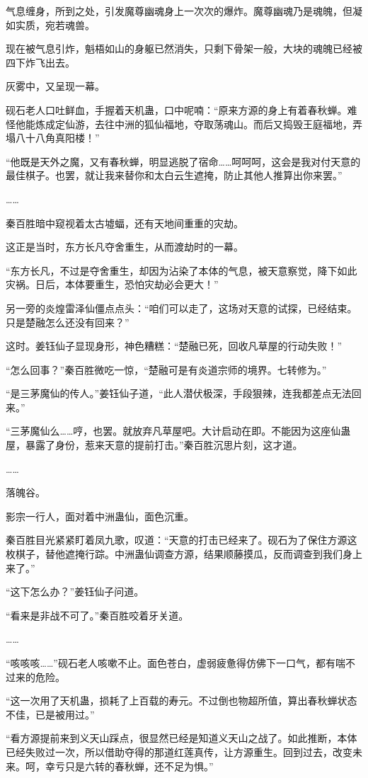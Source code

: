 \begin{this_body}
气息缠身，所到之处，引发魔尊幽魂身上一次次的爆炸。魔尊幽魂乃是魂魄，但凝如实质，宛若魂兽。

现在被气息引炸，魁梧如山的身躯已然消失，只剩下骨架一般，大块的魂魄已经被四下炸飞出去。

灰雾中，又呈现一幕。

砚石老人口吐鲜血，手握着天机蛊，口中呢喃：“原来方源的身上有着春秋蝉。难怪他能炼成定仙游，去往中洲的狐仙福地，夺取荡魂山。而后又捣毁王庭福地，弄塌八十八角真阳楼！”

“他既是天外之魔，又有春秋蝉，明显逃脱了宿命……呵呵呵，这会是我对付天意的最佳棋子。也罢，就让我来替你和太白云生遮掩，防止其他人推算出你来罢。”

……

秦百胜暗中窥视着太古墟蝠，还有天地间重重的灾劫。

这正是当时，东方长凡夺舍重生，从而渡劫时的一幕。

“东方长凡，不过是夺舍重生，却因为沾染了本体的气息，被天意察觉，降下如此灾祸。日后，本体要重生，恐怕灾劫必会更大！”

另一旁的炎煌雷泽仙僵点点头：“咱们可以走了，这场对天意的试探，已经结束。只是楚融怎么还没有回来？”

这时。姜钰仙子显现身形，神色糟糕：“楚融已死，回收凡草屋的行动失败！”

“怎么回事？”秦百胜微吃一惊，“楚融可是有炎道宗师的境界。七转修为。”

“是三茅魔仙的传人。”姜钰仙子道，“此人潜伏极深，手段狠辣，连我都差点无法回来。”

“三茅魔仙么……哼，也罢。就放弃凡草屋吧。大计启动在即。不能因为这座仙蛊屋，暴露了身份，惹来天意的提前打击。”秦百胜沉思片刻，这才道。

……

落魄谷。

影宗一行人，面对着中洲蛊仙，面色沉重。

秦百胜目光紧紧盯着凤九歌，叹道：“天意的打击已经来了。砚石为了保住方源这枚棋子，替他遮掩行踪。中洲蛊仙调查方源，结果顺藤摸瓜，反而调查到我们身上来了。”

“这下怎么办？”姜钰仙子问道。

“看来是非战不可了。”秦百胜咬着牙关道。

……

“咳咳咳……”砚石老人咳嗽不止。面色苍白，虚弱疲惫得仿佛下一口气，都有喘不过来的危险。

“这一次用了天机蛊，损耗了上百载的寿元。不过倒也物超所值，算出春秋蝉状态不佳，已是被用过。”

“看方源提前来到义天山踩点，很显然已经是知道义天山之战了。如此推断，本体已经失败过一次，所以借助夺得的那道红莲真传，让方源重生。回到过去，改变未来。呵，幸亏只是六转的春秋蝉，还不足为惧。”


\end{this_body}
